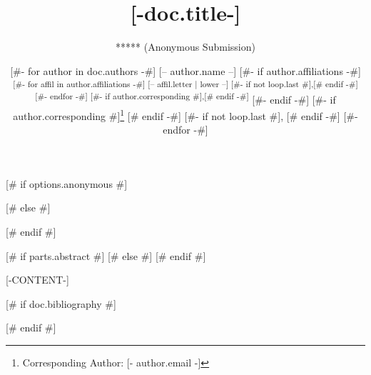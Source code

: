 \documentclass{isprs} %
\begin{document}
\title{[-doc.title-]}
\date{}


[# if options.anonymous #]
\author{***** (Anonymous Submission)}
\address{**** (Anonymous Submission)}
[# else #]
\author{
[#- for author in doc.authors -#]
[-- author.name --]
[#- if author.affiliations -#]
\textsuperscript{
	[#- for affil in author.affiliations -#]
		[-- affil.letter | lower --]
		[#- if not loop.last #],[# endif -#]
	[#- endfor -#]
[#- if author.corresponding #],[# endif -#]
}
[#- endif -#]
[#- if author.corresponding #]\thanks{Corresponding Author: [- author.email -]} [# endif -#]
[#- if not loop.last #], [# endif -#]
[#- endfor -#]
}
\address{
	[#- for affil in doc.affiliations -#]
	\textsuperscript{[- affil.letter | lower -]}
	[-affil.value.name-]
	[#- endfor -#]
}
[# endif #]



\icwg{}   %

[# if parts.abstract #]
[# else #]
[# endif #]


\maketitle


[-CONTENT-]

[# if doc.bibliography #]
{
	\begin{spacing}{1.17}
		\normalsize
	\end{spacing}
}
[# endif #]
\end{document}
